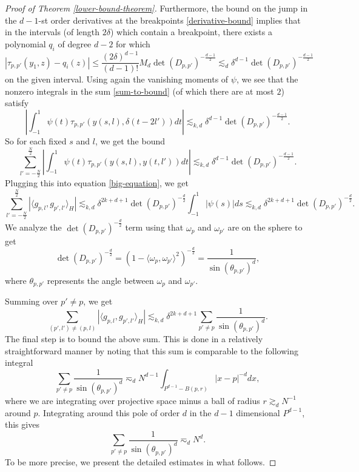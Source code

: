 \begin{proof}[Proof of Theorem \ref{lower-bound-theorem}]
 Furthermore, the bound on the jump in the $d-1$-st order derivatives at the breakpoints \eqref{derivative-bound} implies that in the intervals (of length $2\delta$) which contain a breakpoint, there exists a polynomial $q_i$ of degree $d-2$ for which
 \begin{equation}
  |\tau_{p,p'}(y_1,z) - q_i(z)| \leq \frac{(2\delta)^{d-1}}{(d-1)!}M_d \det(D_{p,p'})^{-\frac{d-1}{2}} \lesssim_d \delta^{d-1} \det(D_{p,p'})^{-\frac{d-1}{2}}
 \end{equation}
 on the given interval. Using again the vanishing moments of $\psi$, we see that the nonzero integrals in the sum \eqref{sum-to-bound} (of which there are at most $2$) satisfy
 $$
 \left|\int_{-1}^1 \psi(t)\tau_{p,p'}(y(s,l), \delta (t - 2l'))dt\right| \lesssim_{k,d} \delta^{d-1}\det(D_{p,p'})^{-\frac{d-1}{2}}.
 $$
 So for each fixed $s$ and $l$, we get the bound
 \begin{equation}
  \sum_{l'=-\frac{N}{2}}^{\frac{N}{2}}\left|\int_{-1}^1 \psi(t)\tau_{p,p'}(y(s,l), y(t,l'))dt\right| \lesssim_{k,d} \delta^{d-1} \det(D_{p,p'})^{-\frac{d-1}{2}}.
 \end{equation}
 Plugging this into equation \eqref{big-equation}, we get
 \begin{equation}
  \sum_{l'=-\frac{N}{2}}^{\frac{N}{2}} |\langle g_{p,l}, g_{p',l'}\rangle_{H}| \lesssim_{k,d} \delta^{2k+d+1}\det(D_{p,p'})^{-\frac{d}{2}}\int_{-1}^1|\psi(s)| ds \lesssim_{k,d} \delta^{2k+d+1}\det(D_{p,p'})^{-\frac{d}{2}}.
 \end{equation}
We analyze the $\det(D_{p,p'})^{-\frac{d}{2}}$ term using that $\omega_p$ and $\omega_{p'}$ are on the sphere to get
\begin{equation}
 \det(D_{p,p'})^{-\frac{d}{2}} = (1-\langle \omega_p,\omega_{p'}\rangle^2)^{-\frac{d}{2}} = \frac{1}{\sin(\theta_{p,p'})^d},
\end{equation}
where $\theta_{p,p'}$ represents the angle between $\omega_p$ and $\omega_{p'}$.

Summing over $p'\neq p$, we get
\begin{equation}\label{eq-1357}
 \sum_{(p',l')\neq (p,l)} |\langle g_{p,l}, g_{p',l'}\rangle_H| \lesssim_{k,d} \delta^{2k+d+1}\sum_{p'\neq p}\frac{1}{\sin(\theta_{p,p'})^d}.
\end{equation}
The final step is to bound the above sum. This is done in a relatively straightforward manner by noting that this sum is comparable to the following integral 
\begin{equation}
 \sum_{p'\neq p}\frac{1}{\sin(\theta_{p,p'})^d} \eqsim_d N^{d-1}\int_{P^{d-1}-B(p,r)} |x-p|^{-d}dx,
\end{equation}
where we are integrating over projective space minus a ball of radius $r \gtrsim_d N^{-1}$ around $p$. Integrating around this pole of order $d$ in the $d-1$ dimensional $P^{d-1}$, this gives
\begin{equation}
 \sum_{p'\neq p}\frac{1}{\sin(\theta_{p,p'})^d} \eqsim_d N^d.
\end{equation}
To be more precise, we present the detailed estimates in what follows.


\end{proof}
